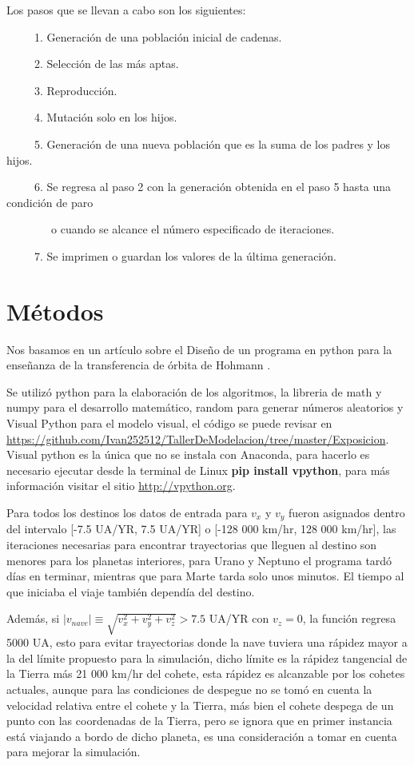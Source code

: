 \documentclass[12pt,letterpaper]{article}
\begin{document}
Los pasos que se llevan a cabo son los siguientes:

\ \ \ \ \ 1. Generación de una población inicial de cadenas.

\ \ \ \ \ 2. Selección de las más aptas.

\ \ \ \ \ 3. Reproducción.

\ \ \ \ \ 4. Mutación solo en los hijos.

\ \ \ \ \ 5. Generación de una nueva población que es la suma de los padres y los hijos.

\ \ \ \ \ 6. Se regresa al paso 2 con la generación obtenida en el paso 5 hasta una condición de paro 

\ \ \ \ \ \ \ \ o cuando se alcance el número especificado de iteraciones.

\ \ \ \ \ 7. Se imprimen o guardan los valores de la última generación.

\section*{Métodos}

Nos basamos en un artículo sobre el Diseño de un programa en python para la enseñanza de la transferencia de
órbita de Hohmann \citep{mendez2016diseno}.

Se utilizó python para la elaboración de los algoritmos, la libreria de math y numpy para el desarrollo matemático, random para generar números aleatorios y Visual Python para el modelo visual, el código se puede revisar en \url{https://github.com/Ivan252512/TallerDeModelacion/tree/master/Exposicion}. Visual python es la única que no se instala con Anaconda, para hacerlo es necesario ejecutar desde la terminal de Linux \textbf{pip install vpython}, para más información visitar el sitio \url{http://vpython.org}.

Para todos los destinos los datos de entrada para $v_x$ y $v_y$ fueron asignados dentro del intervalo [-7.5 UA/YR, 7.5 UA/YR] o [-128 000 km/hr, 128 000 km/hr], las iteraciones necesarias para encontrar trayectorias que lleguen al destino son menores  para los planetas interiores, para Urano y Neptuno el programa tardó días en terminar, mientras que para Marte tarda solo unos minutos. El tiempo al que iniciaba el viaje también dependía del destino.

Además, si $|v_{nave}|\equiv \sqrt{v_x^2+v_y^2+v_z^2}>7.5$ UA/YR con $v_z=0$, la función regresa 5000 UA, esto para evitar trayectorias donde la nave tuviera una rápidez mayor a la del límite propuesto para la simulación, dicho límite 
es la rápidez tangencial de la Tierra más 21 000 km/hr del cohete, esta rápidez es alcanzable por los cohetes actuales, aunque para las condiciones de despegue no se tomó en cuenta la velocidad relativa entre el cohete y la Tierra, más bien el cohete despega de un punto con las coordenadas de la Tierra, pero se ignora que en primer instancia está viajando a bordo de dicho planeta, es una consideración a tomar en cuenta para mejorar la simulación.
\end{document}
